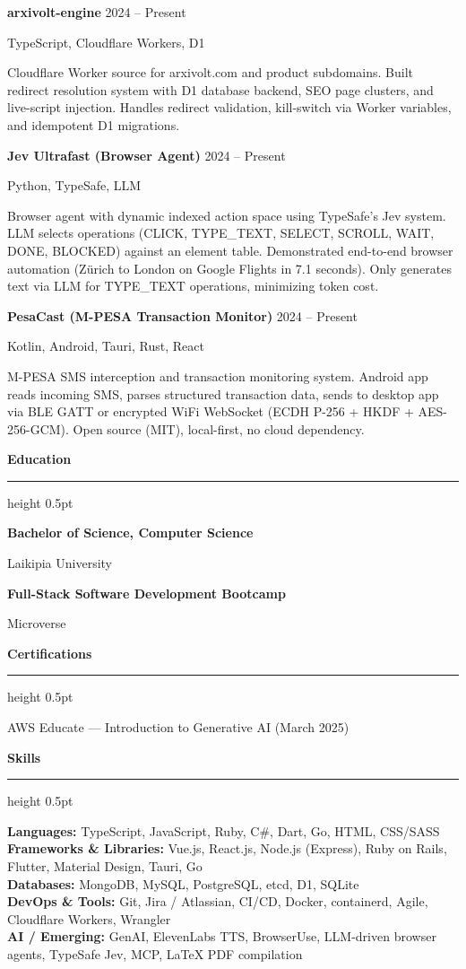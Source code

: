\documentclass[10pt,a4paper]{article}
\newcommand{\cvsection}[1]{%
    \par\vspace{8pt}%
    {\color{headingcolor}\Large\bfseries #1}\par
    \vspace{2pt}%
    {\color{rulecolor}\hrule height 0.5pt}%
    \vspace{4pt}%
}
\newcommand{\entry}[4]{%
    \par\vspace{4pt}
    {\textbf{#1} \hfill #2}\par
    {\small #3 \hfill #4}\par
    \vspace{2pt}
}
\begin{document}
\vspace{4pt}

\entry{arxivolt-engine}{2024 -- Present}{TypeScript, Cloudflare Workers, D1}{}
Cloudflare Worker source for arxivolt.com and product subdomains. Built redirect resolution system with D1 database backend, SEO page clusters, and live-script injection. Handles redirect validation, kill-switch via Worker variables, and idempotent D1 migrations.

\vspace{4pt}

\entry{Jev Ultrafast (Browser Agent)}{2024 -- Present}{Python, TypeSafe, LLM}{}
Browser agent with dynamic indexed action space using TypeSafe's Jev system. LLM selects operations (CLICK, TYPE\_TEXT, SELECT, SCROLL, WAIT, DONE, BLOCKED) against an element table. Demonstrated end-to-end browser automation (Zürich to London on Google Flights in 7.1 seconds). Only generates text via LLM for TYPE\_TEXT operations, minimizing token cost.

\vspace{4pt}

\entry{PesaCast (M-PESA Transaction Monitor)}{2024 -- Present}{Kotlin, Android, Tauri, Rust, React}{}
M-PESA SMS interception and transaction monitoring system. Android app reads incoming SMS, parses structured transaction data, sends to desktop app via BLE GATT or encrypted WiFi WebSocket (ECDH P-256 + HKDF + AES-256-GCM). Open source (MIT), local-first, no cloud dependency.

\cvsection{Education}

\entry{Bachelor of Science, Computer Science}{}{Laikipia University}{}
\entry{Full-Stack Software Development Bootcamp}{}{Microverse}{}

\cvsection{Certifications}
AWS Educate --- Introduction to Generative AI (March 2025)

\cvsection{Skills}
\textbf{Languages:} TypeScript, JavaScript, Ruby, C\#, Dart, Go, HTML, CSS/SASS\\
\textbf{Frameworks \& Libraries:} Vue.js, React.js, Node.js (Express), Ruby on Rails, Flutter, Material Design, Tauri, Go\\
\textbf{Databases:} MongoDB, MySQL, PostgreSQL, etcd, D1, SQLite\\
\textbf{DevOps \& Tools:} Git, Jira / Atlassian, CI/CD, Docker, containerd, Agile, Cloudflare Workers, Wrangler\\
\textbf{AI / Emerging:} GenAI, ElevenLabs TTS, BrowserUse, LLM-driven browser agents, TypeSafe Jev, MCP, LaTeX PDF compilation
\end{document}
